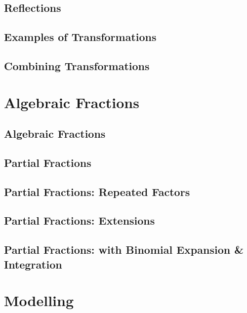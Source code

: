 \documentclass[../maths.tex]{subfiles}
\begin{document}
\subsection*{Reflections}
\subsection*{Examples of Transformations}
\subsection*{Combining Transformations}
\section{Algebraic Fractions}
\subsection*{Algebraic Fractions}
\subsection*{Partial Fractions}
\subsection*{Partial Fractions: Repeated Factors}
\subsection*{Partial Fractions: Extensions}
\subsection*{Partial Fractions: with Binomial Expansion \& Integration}
\section{Modelling}
\end{document}
